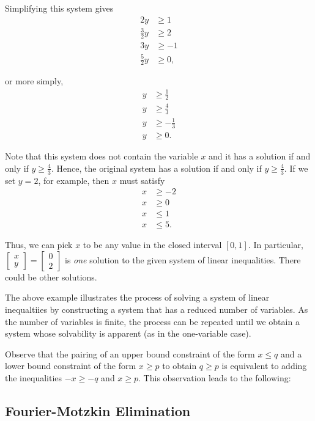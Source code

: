 Simplifying this system gives
\begin{align*}
2y & \geq 1 \\
\frac{3}{2}y & \geq 2  \\
3y & \geq -1 \\
\frac{5}{2}y & \geq 0,
\end{align*}

or more simply,
\begin{align*}
y & \geq \frac{1}{2} \\
y & \geq \frac{4}{3}  \\
y & \geq -\frac{1}{3} \\
y & \geq 0.
\end{align*}

Note that this system does not contain the variable \(x\) and it has a
solution if and only if \(y \geq \frac{4}{3}\). Hence, the original
system has a solution if and only if \(y \geq \frac{4}{3}\). If we set
\(y = 2\), for example, then \(x\) must satisfy
\begin{align*}
x & \geq - 2  \\
x & \geq 0 \\
x & \leq 1 \\
x & \leq 5.
\end{align*}

Thus, we can pick \(x\) to be any value in the closed interval
\([0,1]\). In particular,
\(\begin{bmatrix} x\\ y\end{bmatrix} = \begin{bmatrix} 0 \\ 2\end{bmatrix}\)
is \emph{one} solution to the given system of linear inequalities. There
could be other solutions.

The above example illustrates the process of solving a system of linear
inequaltiies by constructing a system that has a reduced number of
variables. As the number of variables is finite, the process can be
repeated until we obtain a system whose solvability is apparent (as in
the one-variable case).

Observe that the pairing of an upper bound constraint of the form
\(x \leq q\) and a lower bound constraint of the form \(x \geq p\) to
obtain \(q \geq p\) is equivalent to adding the inequalities
\(-x \geq -q\) and \(x \geq p\). This observation leads to the
following:

\hypertarget{fm}{\subsection{Fourier-Motzkin Elimination}\label{fm}}

